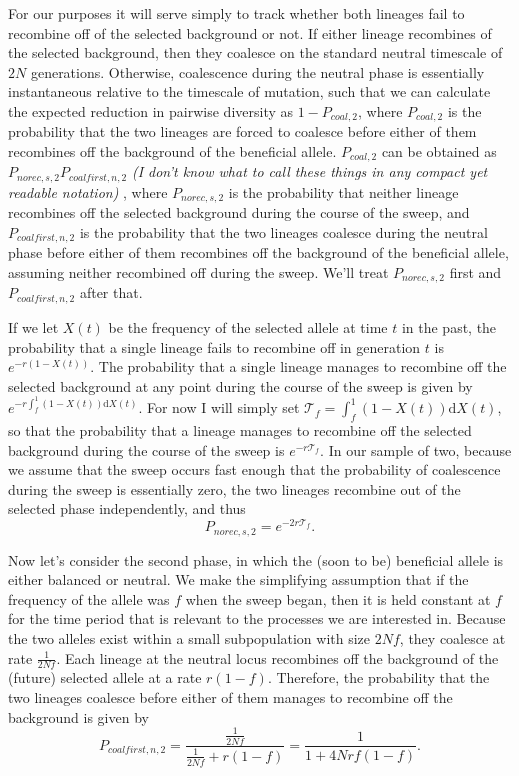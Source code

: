 \documentclass[a4paper,10pt]{article}
\newcommand{\jb}[1]{{\it\color{blue} (#1)} }
\begin{document}
For our purposes it will serve simply to track whether both lineages fail to recombine off of the selected background or not. If either lineage recombines of the selected background, then they coalesce on the standard neutral timescale of $2N$ generations. Otherwise, coalescence during the neutral phase is essentially instantaneous relative to the timescale of mutation, such that we can calculate the expected reduction in pairwise diversity as $1-P_{coal,2}$, where $P_{coal,2}$ is the probability that the two lineages are forced to coalesce before either of them recombines off the background of the beneficial allele. $P_{coal,2}$ can be obtained as $P_{norec,s,2}P_{coalfirst,n,2}$ \jb{I don't know what to call these things in any compact yet readable notation}, where $P_{norec,s,2}$ is the probability that neither lineage recombines off the selected background during the course of the sweep, and $P_{coalfirst,n,2}$ is the probability that the two lineages coalesce during the neutral phase before either of them recombines off the background of the beneficial allele, assuming neither recombined off during the sweep. We'll treat $P_{norec,s,2}$ first and $P_{coalfirst,n,2}$ after that.

If we let $X\left(t\right)$ be the frequency of the selected allele at time $t$ in the past, the probability that a single lineage fails to recombine off in generation $t$ is $e^{-r\left(1-X(t)\right)}$. The probability that a single lineage manages to recombine off the selected background at any point during the course of the sweep is given by $e^{-r \int_f^{1}(1-X\left(t\right))\mathrm{d}X\left(t\right)}$. For now I will simply set $\mathcal{T}_f = \int_f^{1}(1-X\left(t\right))\mathrm{d}X\left(t\right)$, so that the probability that a lineage manages to recombine off the selected background during the course of the sweep is $e^{-r\mathcal{T}_f}$. In our sample of two, because we assume that the sweep occurs fast enough that the probability of coalescence during the sweep is essentially zero, the two lineages recombine out of the selected phase independently, and thus
$$P_{norec,s,2} = e^{-2r\mathcal{T}_f}.$$

Now let's consider the second phase, in which the (soon to be) beneficial allele is either balanced or neutral. We make the simplifying assumption that if the frequency of the allele was $f$ when the sweep began, then it is held constant at $f$ for the time period that is relevant to the processes we are interested in. Because the two alleles exist within a small subpopulation with size $2Nf$, they coalesce at rate $\frac{1}{2Nf}$. Each lineage at the neutral locus recombines off the background of the (future) selected allele at a rate $r(1-f)$. Therefore, the probability that the two lineages coalesce before either of them manages to recombine off the background is given by
$$P_{coalfirst,n,2} = \frac{\frac{1}{2Nf}}{\frac{1}{2Nf} + r(1-f)} = \frac{1}{1 + 4Nrf(1-f)}.$$
\end{document}
